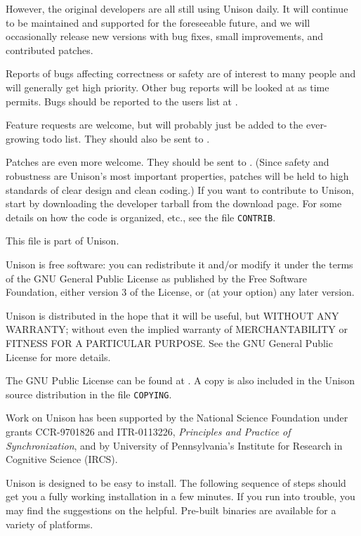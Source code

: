 \documentclass{article}
\begin{document}
However, the original developers are all still using Unison daily.  It
will continue to be maintained and supported for the foreseeable future,
and we will occasionally release new versions with bug fixes, small
improvements, and contributed patches.

Reports of bugs affecting correctness or safety are of interest to many
people and will generally get high priority.  Other bug reports will be
looked at as time permits.  Bugs should be reported to the users list at
\UNISONUSERS. 

Feature requests are welcome, but will probably just be added to the
ever-growing todo list.  They should also be sent to \UNISONUSERS.

Patches are even more welcome.  They should be sent to
\UNISONHACKERS.
(Since safety and robustness are Unison's most important properties,
patches will be held to high standards of clear design and clean coding.)
If you want to contribute to Unison, start by downloading the developer
tarball from the download page.  For some details on how the code is
organized, etc., see the file {\tt CONTRIB}.


This file is part of Unison.

    Unison is free software: you can redistribute it and/or modify
    it under the terms of the GNU General Public License as published by
    the Free Software Foundation, either version 3 of the License, or
    (at your option) any later version.

    Unison is distributed in the hope that it will be useful,
    but WITHOUT ANY WARRANTY; without even the implied warranty of
    MERCHANTABILITY or FITNESS FOR A PARTICULAR PURPOSE.  See the
    GNU General Public License for more details.

    The GNU Public License can be found at
    .  A copy is also included in the
    Unison source distribution in the file {\tt COPYING}.


Work on Unison has been supported by the National Science Foundation
under grants CCR-9701826 and ITR-0113226, {\em Principles and Practice of
  Synchronization}, and by University of Pennsylvania's Institute for
Research in Cognitive Science (IRCS).


Unison is designed to be easy to install.  The following sequence of
steps should get you a fully working installation in a few minutes.  If
you run into trouble, you may find the suggestions on the 
 helpful.  Pre-built binaries are available for a
variety of platforms.
\end{document}
